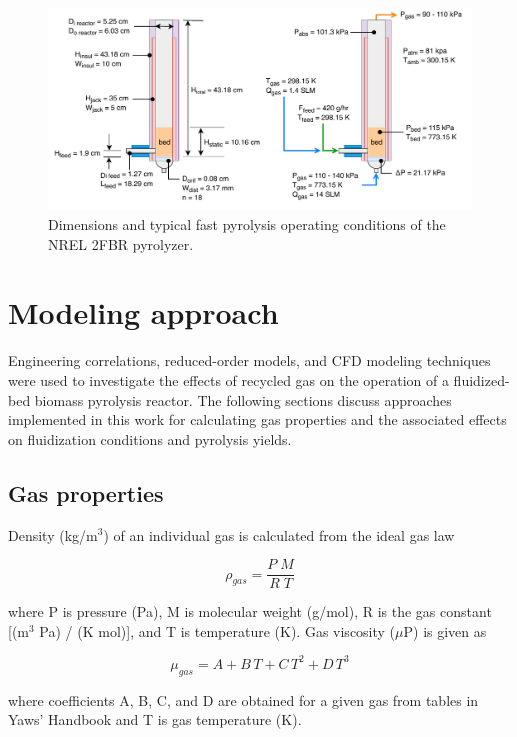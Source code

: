 \documentclass{article}
\begin{document}
\begin{figure}[ht]
    \centering
    \includegraphics[width=\textwidth]{pyrolyzer.pdf}
    \caption{Dimensions and typical fast pyrolysis operating conditions of the NREL 2FBR pyrolyzer.}
    \label{fig:nrel-pyrolyzer}
\end{figure}

\section{Modeling approach}

Engineering correlations, reduced-order models, and CFD modeling techniques were used to investigate the effects of recycled gas on the operation of a fluidized-bed biomass pyrolysis reactor. The following sections discuss approaches implemented in this work for calculating gas properties and the associated effects on fluidization conditions and pyrolysis yields.

\subsection{Gas properties}

Density (kg/m$^3$) of an individual gas is calculated from the ideal gas law

\begin{equation}
    \rho_{gas} = \frac{P\;M}{R\;T}
\end{equation}

\noindent where P is pressure (Pa), M is molecular weight (g/mol), R is the gas constant [(m$^3$ Pa) / (K mol)], and T is temperature (K). Gas viscosity ($\mu$P) is given as

\begin{equation}
    \mu_{gas} = A + B\,T + C\,T^2 + D\,T^3
\end{equation}

\noindent where coefficients A, B, C, and D are obtained for a given gas from tables in Yaws' Handbook and T is gas temperature (K).
\end{document}
